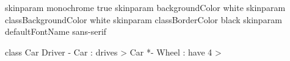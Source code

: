 \documentclass{scrartcl}
\begin{document}
\begin{plantumlpreamble}
skinparam monochrome true
skinparam backgroundColor white
skinparam classBackgroundColor white
skinparam classBorderColor black
skinparam defaultFontName sans-serif
\end{plantumlpreamble}


\begin{plantuml}
class Car
Driver - Car : drives >
Car *- Wheel : have 4 >
\end{plantuml}
\end{document}
